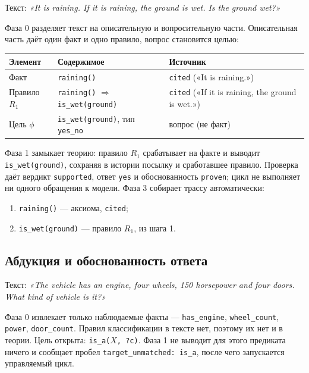 \documentclass[11pt,a4paper]{article}
\begin{document}
Текст: \emph{«It is raining. If it is raining, the ground is wet. Is the ground wet?»}

Фаза 0 разделяет текст на описательную и вопросительную части. Описательная часть даёт один факт и одно правило, вопрос становится целью:

\begin{center}
\begin{tabular}{lll}
\toprule
\textbf{Элемент} & \textbf{Содержимое} & \textbf{Источник} \\
\midrule
Факт & \texttt{raining()} & \texttt{cited} («It is raining.») \\
Правило $R_1$ & \texttt{raining()} $\Rightarrow$ \texttt{is\_wet(ground)} & \texttt{cited} («If it is raining, the ground is wet.») \\
Цель $\phi$ & \texttt{is\_wet(ground)}, тип \texttt{yes\_no} & вопрос (не факт) \\
\bottomrule
\end{tabular}
\end{center}

Фаза 1 замыкает теорию: правило $R_1$ срабатывает на факте и выводит \texttt{is\_wet(ground)}, сохраняя в истории посылку
и сработавшее правило. Проверка даёт вердикт \texttt{supported}, ответ \texttt{yes} и обоснованность \texttt{proven};
цикл не выполняет ни одного обращения к модели. Фаза 3 собирает трассу автоматически:

\begin{enumerate}
	\item \texttt{raining()} — аксиома, \texttt{cited};
	\item \texttt{is\_wet(ground)} — правило $R_1$, из шага 1.
\end{enumerate}

\subsection{Абдукция и обоснованность ответа}

Текст: \emph{«The vehicle has an engine, four wheels, 150 horsepower and four doors. What kind of vehicle is it?»}

Фаза 0 извлекает только наблюдаемые факты — \texttt{has\_engine}, \texttt{wheel\_count}, \texttt{power},
\texttt{door\_count}. Правил классификации в тексте нет, поэтому их нет и в теории. Цель открыта:
\texttt{is\_a($X$, ?c)}. Фаза 1 не выводит для этого предиката ничего и сообщает пробел
\texttt{target\_unmatched: is\_a}, после чего запускается управляемый цикл.
\end{document}
